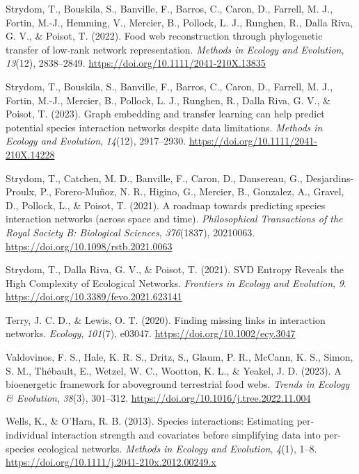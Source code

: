 \documentclass[
]{article}
\newlength{\cslhangindent}
\newenvironment{CSLReferences}[2] %
 {\begin{list}{}{%
  \setlength{\itemindent}{0pt}
  \setlength{\leftmargin}{0pt}
  \setlength{\parsep}{0pt}
  \ifodd #1
   \setlength{\leftmargin}{\cslhangindent}
   \setlength{\itemindent}{-1\cslhangindent}
  \fi
  \setlength{\itemsep}{#2\baselineskip}}}
 {\end{list}}
\begin{document}
\begin{CSLReferences}{1}{0}
Strydom, T., Bouskila, S., Banville, F., Barros, C., Caron, D., Farrell,
M. J., Fortin, M.-J., Hemming, V., Mercier, B., Pollock, L. J., Runghen,
R., Dalla Riva, G. V., \& Poisot, T. (2022). Food web reconstruction
through phylogenetic transfer of low-rank network representation.
\emph{Methods in Ecology and Evolution}, \emph{13}(12), 2838--2849.
\url{https://doi.org/10.1111/2041-210X.13835}

Strydom, T., Bouskila, S., Banville, F., Barros, C., Caron, D., Farrell,
M. J., Fortin, M.-J., Mercier, B., Pollock, L. J., Runghen, R., Dalla
Riva, G. V., \& Poisot, T. (2023). Graph embedding and transfer learning
can help predict potential species interaction networks despite data
limitations. \emph{Methods in Ecology and Evolution}, \emph{14}(12),
2917--2930. \url{https://doi.org/10.1111/2041-210X.14228}

Strydom, T., Catchen, M. D., Banville, F., Caron, D., Dansereau, G.,
Desjardins-Proulx, P., Forero-Muñoz, N. R., Higino, G., Mercier, B.,
Gonzalez, A., Gravel, D., Pollock, L., \& Poisot, T. (2021). A roadmap
towards predicting species interaction networks (across space and time).
\emph{Philosophical Transactions of the Royal Society B: Biological
Sciences}, \emph{376}(1837), 20210063.
\url{https://doi.org/10.1098/rstb.2021.0063}

Strydom, T., Dalla Riva, G. V., \& Poisot, T. (2021). {SVD Entropy
Reveals} the {High Complexity} of {Ecological Networks}. \emph{Frontiers
in Ecology and Evolution}, \emph{9}.
\url{https://doi.org/10.3389/fevo.2021.623141}

Terry, J. C. D., \& Lewis, O. T. (2020). Finding missing links in
interaction networks. \emph{Ecology}, \emph{101}(7), e03047.
\url{https://doi.org/10.1002/ecy.3047}

Valdovinos, F. S., Hale, K. R. S., Dritz, S., Glaum, P. R., McCann, K.
S., Simon, S. M., Thébault, E., Wetzel, W. C., Wootton, K. L., \&
Yeakel, J. D. (2023). A bioenergetic framework for aboveground
terrestrial food webs. \emph{Trends in Ecology \& Evolution},
\emph{38}(3), 301--312. \url{https://doi.org/10.1016/j.tree.2022.11.004}

Wells, K., \& O'Hara, R. B. (2013). Species interactions: Estimating
per-individual interaction strength and covariates before simplifying
data into per-species ecological networks. \emph{Methods in Ecology and
Evolution}, \emph{4}(1), 1--8.
\url{https://doi.org/10.1111/j.2041-210x.2012.00249.x}


\end{CSLReferences}
\end{document}
